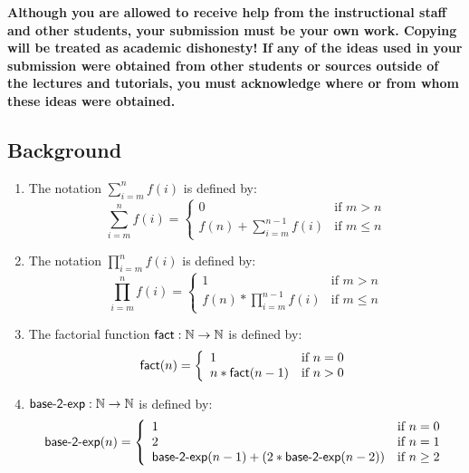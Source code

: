 \documentclass[11pt,fleqn]{article}
\newcommand{\mname}[1]{\mbox{\sf #1}}
\begin{document}
\textbf{Although you are allowed to receive help from the
  instructional staff and other students, your submission must be your
  own work.  Copying will be treated as academic dishonesty! If any of
  the ideas used in your submission were obtained from other students
  or sources outside of the lectures and tutorials, you must
  acknowledge where or from whom these ideas were obtained.}

\subsection*{Background}

\begin{enumerate}

  \item The notation $\sum^{n}_{i=m}f(i)$ is defined by: 
    \[\sum^{n}_{i=m}f(i) =
      \left\{\begin{array}{ll}
               0                          & \textrm{if } m > n\\
               f(n) + \sum^{n-1}_{i=m}f(i) & \textrm{if } m \le n
             \end{array}
      \right.\]

  \item The notation $\prod^{n}_{i=m}f(i)$ is defined by: 
    \[\prod^{n}_{i=m}f(i) =
      \left\{\begin{array}{ll}
               1                          & \textrm{if } m > n\\
               f(n) * \prod^{n-1}_{i=m}f(i) & \textrm{if } m \le n
             \end{array}
      \right.\] 

  \item The factorial function $\mname{fact} : \mathbb{N} \rightarrow
    \mathbb{N}$ is defined by:
    \[\mname{fact}(n) = 
      \left\{\begin{array}{ll}
               1 & \textrm{if } n = 0 \\
               n * \mname{fact}(n-1) & \textrm{if } n > 0 
             \end{array}
      \right.\]

  \item $\mname{base-2-exp} : \mathbb{N} \rightarrow
    \mathbb{N}$ is defined by:
    \[\mname{base-2-exp}(n) = 
      \left\{\begin{array}{ll}
               1 & \textrm{if } n = 0 \\
               2 & \textrm{if } n = 1 \\
               \mname{base-2-exp}(n-1) + (2 * \mname{base-2-exp}(n-2)) & \textrm{if } n \ge 2
             \end{array}
      \right.\]


\end{enumerate}
\end{document}
